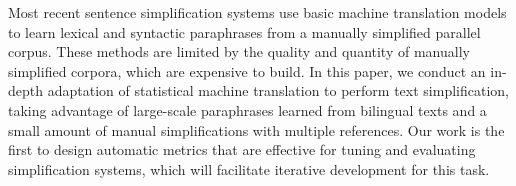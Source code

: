 Most recent sentence simplification systems use basic machine translation models to learn lexical and syntactic paraphrases from a manually simplified parallel corpus. These methods are limited by the quality and quantity of manually simplified corpora, which are expensive to build. In this paper, we conduct an in-depth adaptation of statistical machine translation to perform text simplification, taking advantage of large-scale paraphrases learned from bilingual texts and a small amount of manual simplifications with multiple references. Our work is the first to design automatic metrics that are effective for tuning and evaluating simplification systems, which will facilitate iterative development for this task.
